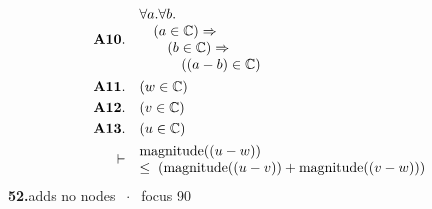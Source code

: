 \documentclass[11pt]{article}
\theoremstyle{plain}
\newcommand{\fit}[1]{\resizebox{\ifdim\width>\linewidth\linewidth\else\width\fi}{!}{#1}}
\begin{document}
\begin{align*}
  \mathbf{A10.}\quad & \begin{array}{@{}l@{}} \forall a. \forall b. \\ \quad (a \in \mathbb{C}) \Rightarrow  \\ \quad \quad (b \in \mathbb{C}) \Rightarrow  \\ \quad \quad \quad ((a - b) \in \mathbb{C}) \end{array} \\
  \mathbf{A11.}\quad & (w \in \mathbb{C}) \\
  \mathbf{A12.}\quad & (v \in \mathbb{C}) \\
  \mathbf{A13.}\quad & (u \in \mathbb{C}) \\
  \vdash\quad & \begin{array}{@{}l@{}} \operatorname{magnitude}((u - w)) \\ \leq\; (\operatorname{magnitude}((u - v)) + \operatorname{magnitude}((v - w))) \end{array}
\end{align*}
\medskip\noindent\textbf{52.}\quad \fit{\texttt{(ass)}}\hfill{\small adds no nodes $\;\cdot\;$ focus 90}\\[2pt]
\end{document}
